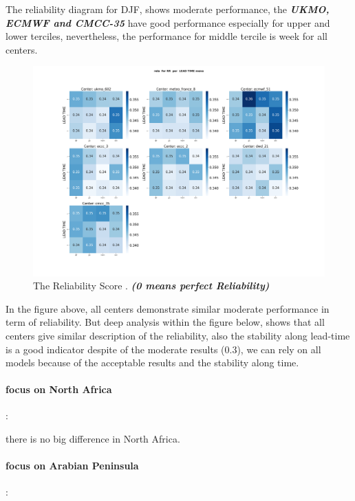 The reliability diagram for DJF, shows moderate performance, the \textbf{\textit{UKMO, ECMWF and CMCC-35}} have good performance especially for  upper and lower terciles, nevertheless, the performance for middle tercile is week for all centers.  

\begin{figure}[H]
    \centering
    \includegraphics[scale=0.25]{plots/prob/rela/rela_RR_mena.png}
    \caption{The Reliability Score  . \textbf{\textit{(0 means perfect Reliability)}}}
\end{figure}

In the figure above, all centers demonstrate similar moderate performance in term of reliability. But deep analysis within the figure below, shows that all centers give similar description of the reliability, also the stability along lead-time is a good indicator despite of the moderate results (0.3), we can rely on all models  because of the acceptable results and the stability along time.
\paragraph{focus on North Africa}:

there is no big difference in North Africa.

\paragraph{focus on Arabian Peninsula}:




